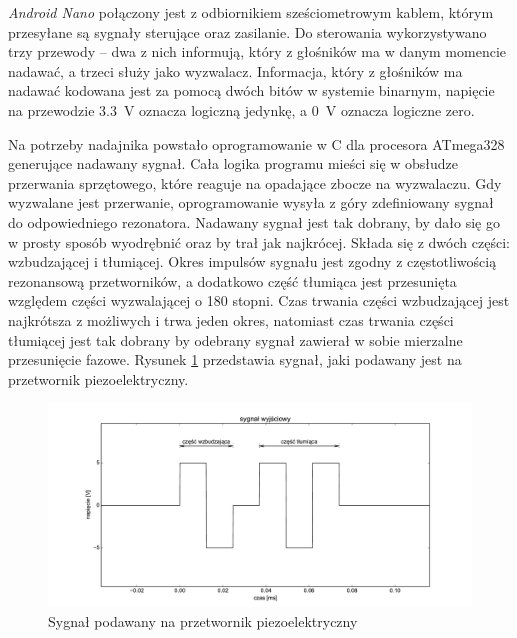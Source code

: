 

\textit{Android Nano} połączony jest z odbiornikiem sześciometrowym kablem, którym przesyłane są sygnały sterujące oraz zasilanie.
Do sterowania wykorzystywano trzy przewody -- dwa z nich informują, który z głośników ma w danym momencie nadawać,
a trzeci służy jako wyzwalacz. 
Informacja, który z głośników  ma nadawać kodowana jest za pomocą dwóch bitów w systemie binarnym,
napięcie na przewodzie \SI{3,3}{V} oznacza logiczną jedynkę, a \SI{0}{V} oznacza logiczne zero.

Na potrzeby nadajnika powstało oprogramowanie w C dla procesora ATmega328 generujące nadawany sygnał.
Cała logika programu mieści się w obsłudze przerwania sprzętowego, które reaguje na opadające zbocze na wyzwalaczu.
Gdy wyzwalane jest przerwanie, oprogramowanie wysyła z góry zdefiniowany sygnał do odpowiedniego rezonatora. 
Nadawany sygnał jest tak dobrany, by dało się go w prosty sposób wyodrębnić oraz by trał jak najkrócej. Składa się z dwóch
części: wzbudzającej i tłumiącej.
Okres impulsów sygnału jest zgodny z częstotliwością rezonansową przetworników, a dodatkowo część tłumiąca
jest przesunięta względem części wyzwalającej o 180 stopni.
Czas trwania części wzbudzającej jest najkrótsza z możliwych i trwa jeden okres, natomiast czas trwania części tłumiącej jest 
tak dobrany by odebrany sygnał zawierał w sobie mierzalne przesunięcie fazowe. 
Rysunek \ref{fig:output_signal} przedstawia sygnał, jaki podawany jest na przetwornik piezoelektryczny.

\begin{figure}[h]
    \centering
    \includegraphics[width=1.0\textwidth, trim= 27mm 0mm 0mm 0mm,clip]{output_signal}
    \caption{Sygnał podawany na przetwornik piezoelektryczny}
    \label{fig:output_signal}
\end{figure}

